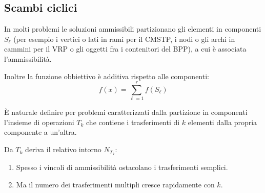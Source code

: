 \documentclass[\main/main.tex]{subfiles}
\begin{document}
\subsection{Scambi ciclici}
\begin{multicols}{2}
\begin{observation}
    In molti problemi le soluzioni ammissibili partizionano gli elementi in componenti \(S_{\ell}\) (per esempio i vertici o lati in rami per il CMSTP, i nodi o gli archi in cammini per il VRP o gli oggetti fra i contenitori del BPP), a cui è associata l'ammissibilità.

    Inoltre la funzione obbiettivo è additiva rispetto alle componenti:
    \[
        f(x)=\sum_{\ell=1}^{r} f\left(S_{\ell}\right)
    \]
\end{observation}
\begin{observation}
    È naturale definire per problemi caratterizzati dalla partizione in componenti l'insieme di operazioni \(T_k\) che contiene i trasferimenti di \(k\) elementi dalla propria componente a un'altra.

    Da \(T_k\) deriva il relativo intorno \(N_{T_k}\):
    \begin{enumerate}
        \item Spesso i vincoli di ammissibilità ostacolano i trasferimenti semplici.
        \item Ma il numero dei trasferimenti multipli cresce rapidamente con \(k\).
    \end{enumerate}
    

\end{observation}
\end{multicols}
\end{document}
